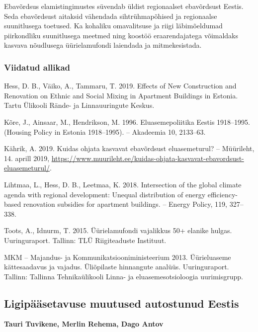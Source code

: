 \documentclass[estonian,]{article}
\begin{document}
Ebavõrdsus elamistingimustes süvendab üldist regionaalset ebavõrdsust Eestis. Seda ebavõrdsust aitaksid vähendada sihtrühmapõhised ja regionaalse suunitlusega toetused. Ka kohaliku omavalitsuse ja riigi läbimõeldumad piirkondliku suunitlusega meetmed ning koostöö eraarendajatega võimaldaks kasvava nõudlusega üürielamufondi laiendada ja mitmekesistada.

\hypertarget{viidatud-allikad-4}{%
\subsubsection*{Viidatud allikad}\label{viidatud-allikad-4}}

Hess, D. B., Väiko, A., Tammaru, T. 2019. Effects of New Construction and Renovation on Ethnic and Social Mixing in Apartment Buildings in Estonia. Tartu Ülikooli Rände- ja Linnauuringute Keskus.

Kõre, J., Ainsaar, M., Hendrikson, M. 1996. Eluasemepoliitika Eestis 1918--1995. (Housing Policy in Estonia 1918--1995). -- Akadeemia 10, 2133--63.

Kährik, A. 2019. Kuidas ohjata kasvavat ebavõrdsust eluasemeturul? -- Müürileht, 14. aprill 2019, \url{https://www.muurileht.ee/kuidas-ohjata-kasvavat-ebavordsust-eluasemeturul/}.

Lihtmaa, L., Hess, D. B., Leetmaa, K. 2018. Intersection of the global climate agenda with regional development: Unequal distribution of energy efficiency-based renovation subsidies for apartment buildings. -- Energy Policy, 119, 327--338.

Toots, A., Idnurm, T. 2015. Üürielamufondi vajalikkus 50+ elanike hulgas. Uuringuraport. Tallinn: TLÜ Riigiteaduste Instituut.

MKM -- Majandus- ja Kommunikatsiooniministeerium 2013. Üürieluaseme kättesaadavus ja vajadus. Üliõpilaste hinnangute analüüs. Uuringuraport. Tallinn: Tallinna Tehnikaülikooli Linna- ja eluasemesotsioloogia uurimisgrupp.

\hypertarget{ligipuxe4uxe4setavuse-muutused-autostunud-eestis}{%
\subsection{Ligipääsetavuse muutused autostunud Eestis}\label{ligipuxe4uxe4setavuse-muutused-autostunud-eestis}}

\begin{authors}
\textbf{Tauri Tuvikene, Merlin Rehema, Dago Antov}
\end{authors}
\end{document}
